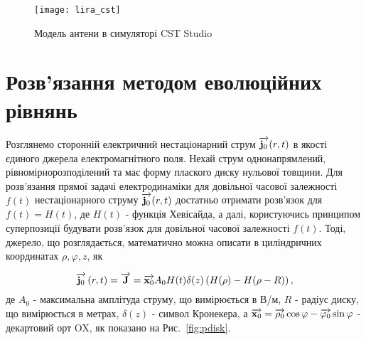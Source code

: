 \begin{figure}[htbp] \begin{center}
\texttt{[image: lira\_cst]}
\caption{Модель антени в симуляторі CST Studio} \label{fig:lira_cst}
\end{center} \end{figure}

\section{Розв'язання методом еволюційних рівнянь} \label{sec:tranc_resp}

Розглянемо сторонній електричний нестаціонарний струм $ \overrightarrow{\mathbf j_0} (r,t) $ 
в якості єдиного джерела електромагнітного поля. Нехай струм 
однонапрямлений, рівномірнорозподілений та має форму плаского диску 
нульової товщини. Для розв'язання прямої задачі електродинаміки для 
довільної часової залежності $ f(t) $ нестаціонарного струму 
$ \overrightarrow{\mathbf j_0} (r,t) $ достатньо отримати розв'язок для  $ f(t) = H(t) $, 
де $ H(t) $ - функція Хевісайда, а далі, користуючись принципом суперпозиції
будувати розв'язок для довільної часової залежності $ f(t) $.
Тоді, джерело, що розглядається, математично можна описати в циліндричних 
координатах $ \rho, \varphi, z $, як

\begin{equation}
\overrightarrow{\mathbf j_0} \left( r, t \right) = \overrightarrow{\mathbf J} = \overrightarrow{\mathbf x_0} A_0 H(t) \delta(z) 
\left(  H(\rho) - H(\rho - R) \right),
\end{equation}
%
де $ A_0 $ - максимальна амплітуда струму, що вимірюється в В/м, $ R $ - 
радіус диску, що вимірюється в метрах, $ \delta(z) $ - символ Кронекера, а 
$ \overrightarrow{\mathbf x_0} = \overrightarrow{\mathbf \rho_0} \cos \varphi - \overrightarrow{\mathbf \varphi_0} \sin \varphi $ 
- декартовий орт OX, як показано на Рис.~\ref{fig:pdisk}.

